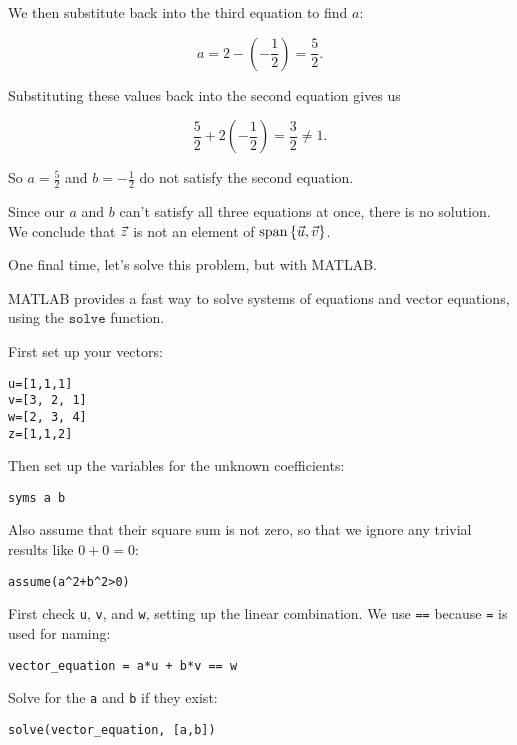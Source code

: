 \documentclass{ximera}
\begin{document}
\begin{exploration}
\begin{example}
\begin{solution}
    We then substitute back into the third equation to find $a$:

    \begin{equation*}
      a = 2 - \left(-\frac{1}{2}\right) = \frac{5}{2}.
    \end{equation*}

    Substituting these values back into the second equation gives us

    \begin{equation*}
      \frac{5}{2} + 2\left(-\frac{1}{2}\right) = \frac{3}{2}\neq 1.
    \end{equation*}

    So $a=\frac{5}{2}$ and $b=-\frac{1}{2}$ do not satisfy the second equation.

    Since our $a$ and $b$ can't satisfy all three equations at once, there is no solution. We conclude
    that $\vec{z}$ is not an element of
    $\text{span}\left\{\vec{u},\vec{v}\right\}$.
  \end{solution}

  \begin{solution}
  
    One final time, let's solve this problem, but with MATLAB. 

    MATLAB provides a fast way to solve systems of equations and vector equations, using the $\texttt{solve}$ function.

    First set up your vectors:
\begin{verbatim}
u=[1,1,1]
v=[3, 2, 1]
w=[2, 3, 4]
z=[1,1,2]
\end{verbatim}

Then set up the variables for the unknown coefficients:
\begin{verbatim}
syms a b
\end{verbatim}

Also assume that their square sum is not zero, so that we ignore any trivial results like \(0 + 0 = 0\):
\begin{verbatim}
assume(a^2+b^2>0)
\end{verbatim}

First check \verb|u|, \verb|v|, and \verb|w|, setting up the linear combination. We use \verb|==| because \verb|=| is used for naming:
\begin{verbatim}
vector_equation = a*u + b*v == w
\end{verbatim}

Solve for the \verb|a| and \verb|b| if they exist:
\begin{verbatim}
solve(vector_equation, [a,b])
\end{verbatim}


\end{solution}
\end{example}
\end{exploration}
\end{document}
